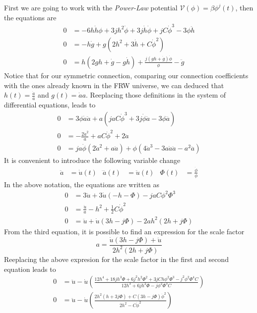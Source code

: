 \documentclass[10pt,a4paper]{article}
\begin{document}
First we are going to work with the \textit{Power-Law} potential $\mathcal{V}(\phi) = \beta \phi^{j}(t)$, then the equations are
\begin{align}
  0 & = -6h\dot{h}\phi + 3 jh^2 \dot{\phi} + 3j\dot{h}\dot{\phi} + jC\dot{\phi}^3 - 3\phi \ddot{h} \\
  0 & = -h\dot{g} + g\left(2h^2 + 3\dot{h} + C\dot{\phi}^2\right) \\
  0 & = h\left(2gh + \dot{g} - g\dot{h}\right) + \frac{j(gh + \dot{g})\dot{\phi}}{\phi} - \ddot{g}
\end{align}
Notice that for our symmetric connection, comparing our connection coefficients with the ones already known in the FRW universe, we can deduced that
$h(t) = \frac{\dot{a}}{a}$ and $g(t) = \dot{a}a$. Reeplacing those definitions in the system of differential equations, leads to
\begin{align}
  0 & = 3\phi \dot{a}\ddot{a} + a\left(jaC\dot{\phi}^3 + 3j \dot{\phi}\ddot{a} - 3\phi \dddot{a}\right) \\
  0 & = -\frac{2\dot{a}^2}{a} + aC\dot{\phi}^2 + 2\ddot{a}\\
  0 & = ja\dot{\phi}\left(2\dot{a}^2 + a\ddot{a}\right) + \phi\left(4\dot{a}^3 -3a\dot{a}\ddot{a} - a^2 \dddot{a}\right)
\end{align}
It is convenient to introduce the following variable change
\begin{align}
  \ddot{a} & = \dot{u}(t) & \dddot{a}(t) & = \ddot{u}(t) & \Phi(t) & = \frac{\dot{\phi}}{\phi}
\end{align}
In the above notation, the equations are written as
\begin{align}
  0 & = 3\ddot{u} + 3\dot{u}\left(-h- \Phi\right) - jaC\phi^2\Phi^3 \\
  0 & = \frac{\dot{u}}{a} - h^2 + \frac{1}{2}C\dot{\phi}^2 \\
  0 & = \ddot{u} + \dot{u}\left(3h - j\Phi\right) - 2ah^2\left(2h + j\Phi\right)
\end{align}
From the third equation, it is possible to find an expression for the scale factor
\begin{equation}
  a = \frac{\dot{u}\left(3h - j\Phi\right) + \ddot{u} }{2h^2\left(2h + j\Phi\right)}
\end{equation}
Reeplacing the above expresion for the scale factor in the first and second equation leads to
\begin{align}
  0 & = \ddot{u} - \dot{u}\left(\frac{12h^4 + 18jh^3\Phi + 6j^2h^2\Phi^2 + 3jCh\phi^2\Phi^3 - j^2\phi^2\Phi^4C}{12h^3 + 6jh^2\Phi - j\phi^2\Phi^3 C}\right) \\
  0 & = \ddot{u} - \dot{u}\left(\frac{2h^2\left(h+3j\Phi\right)+C\left(3h - j\Phi\right)\dot{\phi}^2}{2h^2 - C\dot{\phi}^2}\right)
\end{align}
\end{document}

